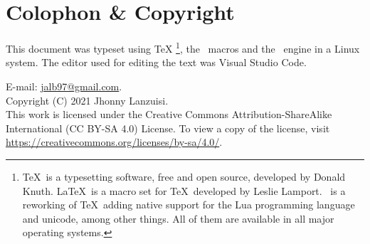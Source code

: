\newpage
\section*{Colophon \& Copyright}
This document was typeset using \TeX%
\footnote{%
    \TeX\ is
    a typesetting software, free and open source,
    developed by Donald Knuth. \LaTeX\ is a macro
    set for \TeX\ developed by Leslie Lamport. \LuaTeX\ is
    a reworking of \TeX\ adding native support for the Lua
    programming language and unicode, among other things.
    All of them are available in all major
    operating systems.
},
the \LaTeXe\ macros and the \LuaLaTeX\ engine in a Linux system.
The editor used for editing the text was Visual Studio Code.

\medskip
%
\begingroup
\ttfamily\small
    \noindent E-mail: \url{jalb97@gmail.com}. \\
    Copyright (C) 2021 Jhonny Lanzuisi. \\
    This work is licensed under the Creative Commons Attri\-bu\-tion-Sha\-re\-Alike
    International (CC BY-SA 4.0)  License. To view a copy of the li\-cense,
    visit \url{https://creativecommons.org/licenses/by-sa/4.0/}.
\endgroup
